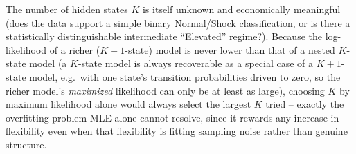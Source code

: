 \documentclass[11pt]{article}
\theoremstyle{definition}
\theoremstyle{remark}
\begin{document}
The number of hidden states $K$ is itself unknown and economically meaningful (does the data support a simple binary Normal/Shock classification, or is there a statistically distinguishable intermediate ``Elevated'' regime?). Because the log-likelihood of a richer ($K+1$-state) model is never lower than that of a nested $K$-state model (a $K$-state model is always recoverable as a special case of a $K+1$-state model, e.g.\ with one state's transition probabilities driven to zero, so the richer model's \emph{maximized} likelihood can only be at least as large), choosing $K$ by maximum likelihood alone would always select the largest $K$ tried -- exactly the overfitting problem MLE alone cannot resolve, since it rewards any increase in flexibility even when that flexibility is fitting sampling noise rather than genuine structure.
\end{document}
